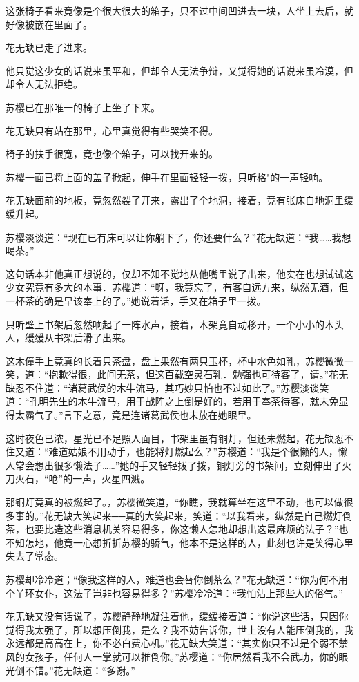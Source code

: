 \documentclass[12pt,oneside]{book}
\begin{document}
这张椅子看来竟像是个很大很大的箱子，只不过中间凹进去一块，人坐上去后，就好像被嵌在里面了。

花无缺已走了进来。

他只觉这少女的话说来虽平和，但却令人无法争辩，又觉得她的话说来虽冷漠，但却令人无法拒绝。

苏樱已在那唯一的椅子上坐了下来。

花无缺只有站在那里，心里真觉得有些哭笑不得。

椅子的扶手很宽，竟也像个箱子，可以找开来的。

苏樱一面已将上面的盖子掀起，伸手在里面轻轻一拨，只听格"的一声轻响。

花无缺面前的地板，竟忽然裂了开来，露出了个地洞，接着，竞有张床自地洞里缓缓升起。

苏樱淡谈道：``现在已有床可以让你躺下了，你还要什么？''花无缺道：``我\ldots\ldots 我想喝茶。''

这句话本非他真正想说的，仅却不知不觉地从他嘴里说了出来，他实在也想试试这少女究竟有多大的本事．苏樱道：``呀，我竟忘了，有客自远方来，纵然无酒，但一杯茶的确是早该奉上的了。''她说着话，手又在箱子里一拨。

只听壁上书架后忽然响起了一阵水声，接着，木架竟自动移开，一个小小的木头人，缓缓从书架后滑了出来。

这木僮手上竟真的长着只茶盘，盘上果然有两只玉杯，杯中水色如乳，苏樱微微一笑，道：``抱歉得很，此间无茶，但这百载空灵石乳．勉强也可待客了，请。''花无缺忍不住道：``诸葛武侯的木牛流马，其巧妙只怕也不过如此了。''苏樱淡谈笑道：``孔明先生的木牛流马，用于战阵之上倒是好的，若用于奉茶待客，就未免显得太霸气了。''言下之意，竟是连诸葛武侯也末放在她眼里。

这时夜色已浓，星光已不足照人面目，书架里虽有铜灯，但还未燃起，花无缺忍不住又道：``难道姑娘不用动手，也能将灯燃起么？''苏樱道：``我是个很懒的人，懒人常会想出很多懒法子\ldots\ldots{}''她的手又轻轻拨了拨，铜灯旁的书架间，立刻伸出了火刀火石，``呛''的一声，火星四溅。

那铜灯竟真的被燃起了。，苏樱微笑道，``你瞧，我就算坐在这里不动，也可以做很多事的。''花无缺大笑起来──真的大笑起来，笑道：``以我看来，纵然是自己燃灯倒茶，也要比造这些消息机关容易得多，你这懒人怎地却想出这最麻烦的法子？''也不知怎地，他竟一心想折折苏樱的骄气，他本不是这样的人，此刻也许是笑得心里失去了常态。

苏樱却冷冷道；``像我这样的人，难道也会替你倒茶么？''花无缺道：``你为何不用个丫环女仆，这法子岂非也容易得多？''苏樱冷冷道：``我怕沾上那些人的俗气。''

花无缺又没有话说了，苏樱静静地凝注着他，缓缓接着道：``你说这些话，只因你觉得我太强了，所以想压倒我，是么？我不妨告诉你，世上没有人能压倒我的，我永远都是高高在上，你不必白费心机。''花无缺大笑道：``其实你只不过是个弱不禁风的女孩子，任何人一掌就可以推倒你。''苏樱道：``你居然看我不会武功，你的眼光倒不错。''花无缺道：``多谢。''
\end{document}

